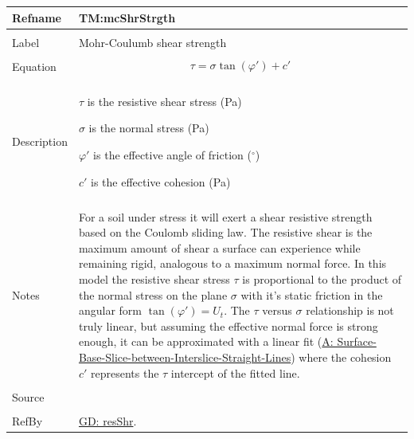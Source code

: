 \documentclass[12pt]{article}
\begin{document}
\noindent \begin{minipage}{\textwidth}
\begin{tabular}{p{} p{}}
\toprule \textbf{Refname} & \textbf{TM:mcShrStrgth}
\label{TM:mcShrStrgth}
\\ \midrule \\
Label & Mohr-Coulumb shear strength
        \\ \midrule \\
        Equation & \begin{displaymath}
                   τ=σ \tan\left(φ'\right)+c'
                   \end{displaymath}
                   \\ \midrule \\
                   Description & \begin{symbDescription}
                                 \item{$τ$ is the resistive shear stress (Pa)}
                                 \item{$σ$ is the normal stress (Pa)}
                                 \item{$φ'$ is the effective angle of friction (${}^{\circ}$)}
                                 \item{$c'$ is the effective cohesion (Pa)}
                                 \end{symbDescription}
                                 \\ \midrule \\
                                 Notes & For a soil under stress it will exert a shear resistive strength based on the Coulomb sliding law. The resistive shear is the maximum amount of shear a surface can experience while remaining rigid, analogous to a maximum normal force. In this model the resistive shear stress $τ$ is proportional to the product of the normal stress on the plane $σ$ with it's static friction in the angular form $\tan\left(φ'\right)={U_{t}}$. The $τ$ versus $σ$ relationship is not truly linear, but assuming the effective normal force is strong enough, it can be approximated with a linear fit (\hyperref[A:Surface-Base-Slice-between-Interslice-Straight-Lines]{A: Surface-Base-Slice-between-Interslice-Straight-Lines}) where the cohesion $c'$ represents the $τ$ intercept of the fitted line.
                                         \\ \midrule \\
                                         Source & \cite{fredlund1977}
                                                  \\ \midrule \\
                                                  RefBy & \hyperref[GD:resShr]{GD: resShr}.
\\ \bottomrule \end{tabular}
\end{minipage}
\par~
\end{document}
